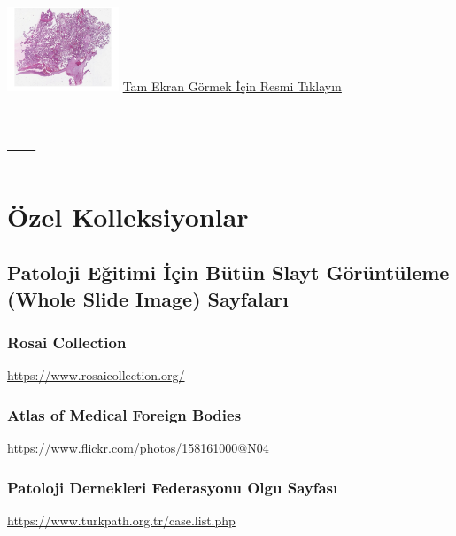 \documentclass[
  letterpaper,
  DIV=11,
  numbers=noendperiod]{scrreprt}
\begin{document}
\href{https://images.patolojiatlasi.com/chorioamnionitis/HE.html}{\includegraphics[width=0.25\textwidth,height=\textheight]{./screenshots/chorioamnionitis_screenshot.png}}
\href{https://images.patolojiatlasi.com/chorioamnionitis/HE.html}{Tam
Ekran Görmek İçin Resmi Tıklayın}

\part{---}

\part{Özel Kolleksiyonlar}

\hypertarget{sec-wsi-sayfalari}{%
\chapter{Patoloji Eğitimi İçin Bütün Slayt Görüntüleme (Whole Slide
Image) Sayfaları}\label{sec-wsi-sayfalari}}

\hypertarget{sec-rosai-collection}{%
\section{Rosai Collection}\label{sec-rosai-collection}}

\url{https://www.rosaicollection.org/}

\hypertarget{sec-atlas-of-medical-foreign-bodies}{%
\section{Atlas of Medical Foreign
Bodies}\label{sec-atlas-of-medical-foreign-bodies}}

\url{https://www.flickr.com/photos/158161000@N04}

\hypertarget{patoloji-dernekleri-federasyonu-olgu-sayfasux131}{%
\section{Patoloji Dernekleri Federasyonu Olgu
Sayfası}\label{patoloji-dernekleri-federasyonu-olgu-sayfasux131}}

\url{https://www.turkpath.org.tr/case.list.php}
\end{document}
